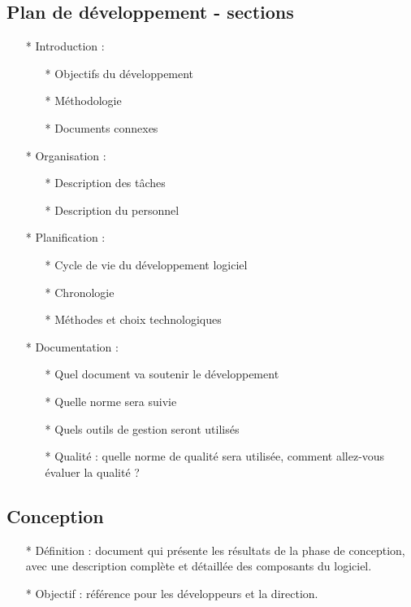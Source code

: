 \documentclass[12pt]{article}
\begin{document}
\subsection{Plan de développement - sections}
\begin{itemize}
	\item[* ] Introduction :
	\begin{itemize}
		\item[* ] Objectifs du développement
		\item[* ] Méthodologie
		\item[* ] Documents connexes
		
	\end{itemize}
\item[* ] Organisation :
\begin{itemize}
	\item[* ] Description des tâches
	\item[* ] Description du personnel
\end{itemize}
\item[* ] Planification :
\begin{itemize}
	\item[* ] Cycle de vie du développement logiciel
	\item[* ] Chronologie
	\item[* ] Méthodes et choix technologiques
\end{itemize}
	\item[* ] Documentation :
	\begin{itemize}
		\item[* ] Quel document va soutenir le développement
		\item[* ] Quelle norme sera suivie
		\item[* ] Quels outils de gestion seront utilisés
		\item[* ] Qualité : quelle norme de qualité sera utilisée, comment allez-vous évaluer la qualité ?
	\end{itemize}
\end{itemize}
\subsection{Conception}
\begin{itemize}
	\item[* ] Définition : document qui présente les résultats de la phase de conception, avec une
	description complète et détaillée des composants du logiciel.
	\item[* ] Objectif : référence pour les développeurs et la direction.
\end{itemize}
\end{document}
